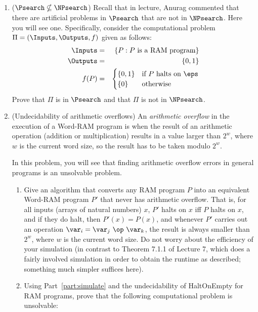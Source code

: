 \documentclass[11pt]{article}
\begin{document}
\begin{enumerate}

    \item ($\Psearch\nsubseteq \NPsearch$)  Recall that in lecture, Anurag commented that there are artificial problems in $\Psearch$ that are not in $\NPsearch$.  Here you will see one.  Specifically, consider the computational problem $\Pi=(\Inputs,\Outputs,f)$ given as follows:
    \begin{eqnarray*}
    \Inputs &=& \{ P : \text{$P$ is a RAM program}\}\\
    \Outputs &=& \{0,1\}\\
    f(P) &=& \begin{cases} \{0,1\} & \text{if $P$ halts on $\eps$}\\
    \{0\} & \text{otherwise}\\
    \end{cases}
    \end{eqnarray*}
    Prove that $\Pi$ is in $\Psearch$ and that $\Pi$ is not in $\NPsearch$.

  \item (Undecidability of arithmetic overflows) An {\em arithmetic overflow} in the execution of a Word-RAM program is when the result of an arithmetic operation (addition or multiplication) results in a value larger than $2^w$, where $w$ is the current word size, so the result has to be taken modulo $2^w$. 

  
  In this problem, you will see that finding arithmetic overflow errors in general programs is an unsolvable problem.

  \begin{enumerate}
      \item Give an algorithm that converts any RAM program $P$ into an equivalent Word-RAM program $P'$ that never has arithmetic overflow.  That is, for all inputs (arrays of natural numbers) $x$, $P'$ halts on $x$ iff $P$ halts on $x$, and if they do halt, then $P'(x)=P(x)$, and whenever $P'$ carries out an operation $\var_i = \var_j\ \op\ \var_k$, the result is always smaller than $2^w$, where $w$ is the current word size.  Do not worry about the efficiency of your simulation (in contrast to Theorem 7.1.1 of Lecture 7, which does a fairly involved simulation in order to obtain the runtime as described; something much simpler suffices here).

      \label{part:simulate}

      \item Using Part~\ref{part:simulate} and the undecidability of HaltOnEmpty for RAM programs, prove that the following computational problem is unsolvable:


\end{enumerate}
\end{enumerate}
\end{document}
